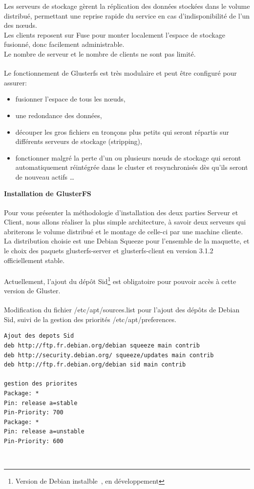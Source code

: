\documentclass[12pt]{report}
\begin{document}
Les serveurs de stockage gèrent la réplication des données stockées dans le volume distribué, permettant une reprise rapide du service en cas d'indisponibilité de l'un des n\oe uds. \\
Les clients reposent sur Fuse pour monter localement l'espace de stockage fusionné, donc facilement administrable.\\
Le nombre de serveur et le nombre de clients ne sont pas limité.\\\\
Le fonctionnement de Glusterfs est très modulaire et peut être configuré pour assurer:\\
	\begin{itemize}
		\item fusionner l'espace de tous les nœuds,
		\item une redondance des données,
		\item découper les gros fichiers en tronçons plus petits qui seront répartis sur différents serveurs de stockage (stripping),
		\item fonctionner malgré la perte d'un ou plusieurs nœuds de stockage qui seront automatiquement réintégrée dans le cluster et resynchronisés dès qu'ils seront de nouveau actifs \dots \\
	\end{itemize}
\newpage
\textbf{Installation de GlusterFS}\\\\
Pour vous présenter la méthodologie d'installation des deux parties Serveur et Client, nous allons réaliser la plus simple architecture, à savoir deux serveurs qui abriterons le volume distribué et le montage de celle-ci par une machine cliente.\\
La distribution choisie est une Debian Squeeze pour l'ensemble de la maquette, et le choix des paquets glusterfs-server et glusterfs-client en version 3.1.2 officiellement stable.\\\\
Actuellement, l'ajout du dépôt Sid\footnote{Version de Debian \og instalble\fg~, en développement} est obligatoire pour pouvoir accès à cette version de Gluster.\\\\
Modification du fichier /etc/apt/sources.list pour l'ajout des dépôts de Debian Sid, suivi de la gestion des priorités /etc/apt/preferences.
\begin{lstlisting}
Ajout des depots Sid
deb http://ftp.fr.debian.org/debian squeeze main contrib
deb http://security.debian.org/ squeeze/updates main contrib
deb http://ftp.fr.debian.org/debian sid main contrib

gestion des priorites
Package: *
Pin: release a=stable
Pin-Priority: 700
Package: *
Pin: release a=unstable
Pin-Priority: 600
	  \end{lstlisting}\\
\end{document}
